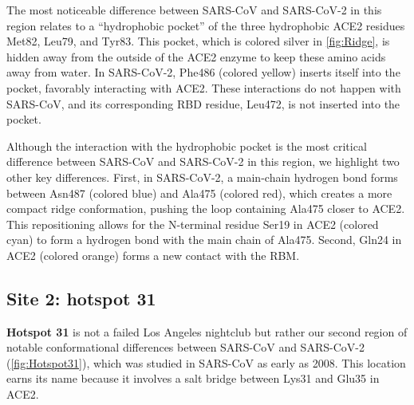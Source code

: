The most noticeable difference between SARS-CoV and SARS-CoV-2 in this region relates to a ``hydrophobic pocket'' of the three hydrophobic ACE2 residues Met82, Leu79, and Tyr83. This pocket, which is colored silver in \autoref{fig:Ridge}, is hidden away from the outside of the ACE2 enzyme to keep these amino acids away from water. In SARS-CoV-2, Phe486 (colored yellow) inserts itself into the pocket, favorably interacting with ACE2. These interactions do not happen with SARS-CoV, and its corresponding RBD residue, Leu472, is not inserted into the pocket.

Although the interaction with the hydrophobic pocket is the most critical difference between SARS-CoV and SARS-CoV-2 in this region, we highlight two other key differences. First, in SARS-CoV-2, a main-chain hydrogen bond forms between Asn487 (colored blue) and Ala475 (colored red), which creates a more compact ridge conformation, pushing the loop containing Ala475 closer to ACE2. This repositioning allows for the N-terminal residue Ser19 in ACE2 (colored cyan) to form a hydrogen bond with the main chain of Ala475. Second, Gln24 in ACE2 (colored orange) forms a new contact with the RBM.

\FloatBarrier
{}
\subsection{Site 2: hotspot 31}

\textbf{Hotspot 31} is not a failed Los Angeles nightclub but rather our second region of notable conformational differences between SARS-CoV and SARS-CoV-2 (\autoref{fig:Hotspot31}), which was studied in SARS-CoV as early as 2008. This location earns its name because it involves a salt bridge between Lys31 and Glu35 in ACE2.\\

